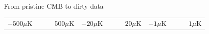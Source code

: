 \documentclass{beamer}
\begin{document}
\begin{frame}{From pristine CMB to dirty data}
\begin{tabular}{ccc}
	\\
	{\footnotesize $-500\mu$K\enskip\includegraphics[width=12mm,height=2mm]{colorbar.png}\enskip$500\mu$K} &
	{\footnotesize $-20\mu$K\enskip\includegraphics[width=12mm,height=2mm]{colorbar.png}\enskip$20\mu$K} &
	{\footnotesize $-1\mu$K\enskip\includegraphics[width=12mm,height=2mm]{colorbar.png}\enskip$1\mu$K}
\end{tabular}\hspace*{-5mm}
\end{frame}
\end{document}
